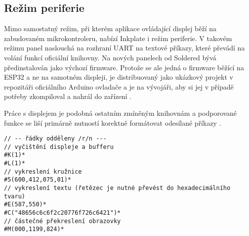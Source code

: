 \subsection{Režim periferie}
Mimo samostatný režim, při kterém aplikace ovládající displej běží na zabudovaném mikrokontroleru, nabízí Inkplate i režim periferie. V takovém režimu panel naslouchá na rozhraní UART na textové příkazy, které převádí na volání funkcí oficiální knihovny. Na nových panelech od Soldered bývá předinstalován jako výchozí firmware. Protože se ale jedná o firmware běžící na ESP32 a ne na samotném displeji, je distribuovaný jako ukázkový projekt v repozitáři oficiálního Arduino ovladače a je na vývojáři, aby si jej v případě potřeby zkompiloval a nahrál do zařízení \cite{SolderedElectronicsInkplatePeripheralModeRaspberryPiExample2023}.

Práce s displejem je podobná ostatním zmíněným knihovnám a podporované funkce se liší primárně nutností korektně formátovat odesílané příkazy \cite{solderedelectronicsInkplatePeripheralMode}.

\begin{lstlisting}[label=src:PeripheralHelloWorld,caption={Ukázka příkazů pro vykreslení kružnice a Hello World řetězce v režimu periferie}]
// -- řádky odděleny /r/n ---
// vyčištění displeje a bufferu
#K(1)*
#L(1)*
// vykreslení kružnice
#5(600,412,075,01)*
// vykreslení textu (řetězec je nutné převést do hexadecimálního tvaru)
#E(587,550)*
#C("48656c6c6f2c20776f726c6421")*
// částečné překreslení obrazovky
#M(000,1199,824)*
\end{lstlisting}
